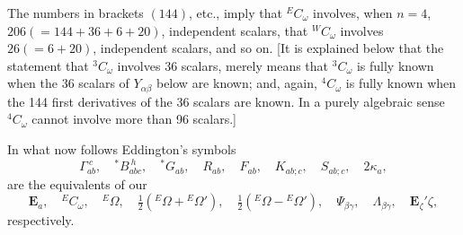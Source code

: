 \documentclass[11pt]{article}
\begin{document}
\indent The numbers in brackets $(144)$, etc., imply that ${}^E C_\omega$ involves, when $n=4$, $206(=144+36+6+20)$, independent scalars, that ${}^W C_\omega$ involves $26(=6+20)$, independent scalars, and so on. [It is explained below that
the statement that ${}^3C_\omega$ involves 36 scalars, merely means that ${}^3C_\omega$ is fully known when the 36 scalars of $Y_{\alpha\beta}$ below are known; and, again, ${}^4C_\omega$ is fully known when the 144 first derivatives of the 36 scalars are known. In a purely algebraic sense ${}^4C_\omega$ cannot involve more than 96 scalars.]

\indent In what now follows Eddington's symbols
\[
\Gamma_{ab}^{\ c},\quad {}^*B_{abc}^{\ h},\quad {}^*G_{ab},\quad R_{ab},\quad F_{ab},\quad K_{ab;c},\quad S_{ab;c},\quad 2\kappa_a,
\]
are the equivalents of our
\[
\mathbf{E}_a,\quad {}^E C_\omega,\quad {}^E\Omega,\quad \tfrac12({}^E\Omega+{}^E\Omega'),\quad \tfrac12({}^E\Omega-{}^E\Omega'),\quad \Psi_{\beta\gamma},\quad \Lambda_{\beta\gamma},\quad \mathbf{E}_\zeta'\zeta,
\]
respectively.
\end{document}
